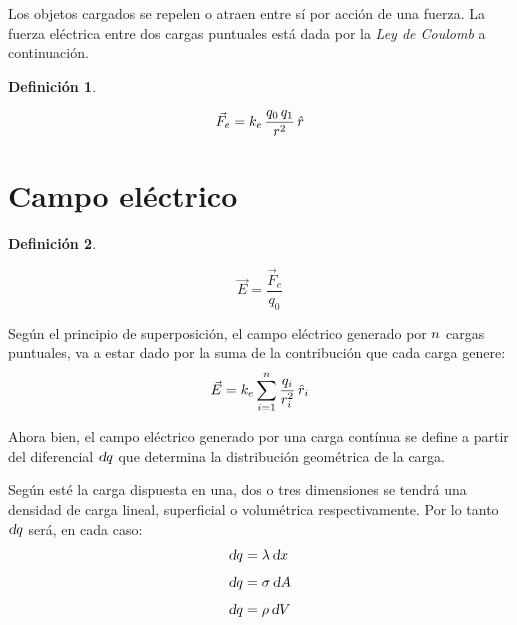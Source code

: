 \documentclass[a5paper,12pt,twoside]{book}
\newtheorem{defn}{{Definición}}[chapter]
\begin{document}
Los objetos cargados se repelen o atraen entre sí por acción de una fuerza.
La fuerza eléctrica entre dos cargas puntuales está dada por la \emph{Ley de Coulomb} a continuación.

\begin{mdframed}[style=MyFrame1]
    \begin{defn}
    \end{defn}
    \begin{equation*}
        \Vec{F}_e = k_e \, \frac{ q_0 \, q_1}{r^2} \, \hat{r}
    \end{equation*}
\end{mdframed}


\section{Campo eléctrico}

\begin{mdframed}[style=MyFrame1]
    \begin{defn}
    \end{defn}
    \begin{equation*}
        \Vec{E} = \frac{\Vec{F}_e}{q_0}
    \end{equation*}
\end{mdframed}

Según el principio de superposición, el campo eléctrico generado por $n$ cargas puntuales, va a estar dado por la suma de la contribución que cada carga genere:
\begin{equation}
    \Vec{E}= k_e \sum_{i=1}^n \frac{q_i}{r_i^2} \, \hat{r}_i
\end{equation}

Ahora bien, el campo eléctrico generado por una carga contínua se define a partir del diferencial $\textsl{d} q$ que determina la distribución geométrica de la carga.

Según esté la carga dispuesta en una, dos o tres dimensiones se tendrá una densidad de carga lineal, superficial o volumétrica respectivamente.
Por lo tanto $\textsl{d} q$ será, en cada caso:
\begin{align*}
    \textsl{d} q &= \lambda \, \textsl{d} x
    \\[1ex]
    \textsl{d} q &= \sigma \, \textsl{d} A
    \\[1ex]
    \textsl{d} q &= \rho \, \textsl{d} V
\end{align*}
\end{document}
